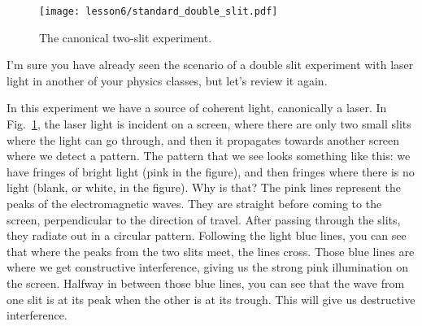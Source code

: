 \begin{figure}[H]
   \centering
    \texttt{[image: lesson6/standard\_double\_slit.pdf]}    
        \caption{The canonical two-slit experiment.}
    \label{fig:two-slit}
   
\end{figure}

I'm sure you have already seen the scenario of a double slit experiment with laser light in another of your physics classes, but let's review it again.

In this experiment we have a source of coherent light, canonically a laser. In Fig.~\ref{fig:two-slit}, the laser light is incident on a screen, where there are only two small slits where the light can go through, and then it propagates towards another screen where we detect a pattern. The pattern that we see looks something like this: we have fringes of bright light (pink in the figure), and then fringes where there is no light (blank, or white, in the figure). Why is that?  The pink lines represent the peaks of the electromagnetic waves. They are straight before coming to the screen, perpendicular to the direction of travel. After passing through the slits, they radiate out in a circular pattern.  Following the light blue lines, you can see that where the peaks from the two slits meet, the lines cross.  Those blue lines are where we get constructive interference, giving us the strong pink illumination on the screen. Halfway in between those blue lines, you can see that the wave from one slit is at its peak when the other is at its trough.  This will give us destructive interference.


